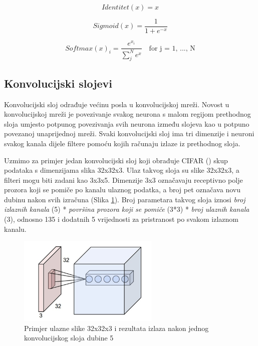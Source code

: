 \documentclass[times, utf8, proizvoljni, numeric]{fer}
\begin{document}
\begin{equation}
\label{eq:f_identiteta}
Identitet(x) = x   
\end{equation}

\begin{equation}
\label{eq:f_sigmoida}
Sigmoid(x) = \frac{1}{1+e^{-x}}    
\end{equation}

\begin{equation}
\label{eq:f_softmax}
Softmax(x)_i = \frac{e^{x_i}}{\sum_{j}^{N}e^{x}} \quad \text{for j = 1, ..., N}
\end{equation}


\subsection{Konvolucijski slojevi}


Konvolucijski sloj odrađuje većinu posla u konvolucijskoj mreži. Novost u konvolucijskoj mreži je povezivanje svakog neurona s malom regijom prethodnog sloja umjesto potpunog povezivanja svih neurona između slojeva kao u potpuno povezanoj unaprijednoj mreži. Svaki konvolucijski sloj ima tri dimenzije i neuroni svakog kanala dijele filtere pomoću kojih računaju izlaze iz prethodnog sloja.

Uzmimo za primjer jedan konvolucijski sloj koji obrađuje CIFAR (\cite{CIFAR10}) skup podataka s dimenzijama slika 32x32x3. Ulaz takvog sloja su slike 32x32x3, a filteri mogu biti zadani kao 3x3x5. Dimenzije 3x3 označavaju receptivno polje prozora koji se pomiče po kanalu ulaznog podatka, a broj pet označava novu dubinu nakon svih izračuna (Slika \ref{fg:konvolucijski_sloj}). Broj parametara takvog sloja iznosi \textit{broj izlaznih kanala} (5) * \textit{površina prozora koji se pomiče} (3*3) * \textit{broj ulaznih kanala} (3), odnosno 135 i dodatnih 5 vrijednosti za pristranost po svakom izlaznom kanalu.

\begin{figure}[!ht]
	\begin{center}
		\captionsetup{justification=centering}
		\includegraphics[width=0.6\textwidth]{./imgs/konvolucijski_sloj.png}
		\caption{Primjer ulazne slike 32x32x3 i rezultata izlaza nakon jednog konvolucijskog sloja dubine 5 \cite{CS231n}}
		\label{fg:konvolucijski_sloj}
	\end{center}
\end{figure}
\end{document}

